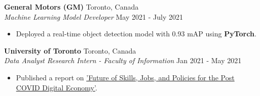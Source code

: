 \documentclass[a4paper]{article}
\begin{document}
\textbf{General Motors (GM)} \hfill Toronto, Canada\\
\textit{Machine Learning Model Developer} \hfill May 2021 - July 2021\\
\vspace{-2.5mm}
\begin{itemize} \itemsep 1pt
	\item Deployed a real-time object detection model with 0.93 mAP using \textbf{PyTorch}.
    \vspace{-1.5mm}
\end{itemize}

\textbf{University of Toronto} \hfill Toronto, Canada\\
\textit{Data Analyst Research Intern - Faculty of Information} \hfill Jan 2021 - May 2021\\
\vspace{-2.5mm}
\begin{itemize} \itemsep 1pt
    \item Published a report on \href{https://futurejobscanada.economics.utoronto.ca/final-report/}{'Future of Skills, Jobs, and Policies for the Post COVID Digital Economy'}.
    \vspace{-1.5mm}
\end{itemize}
\vspace{1mm}
\end{document}
